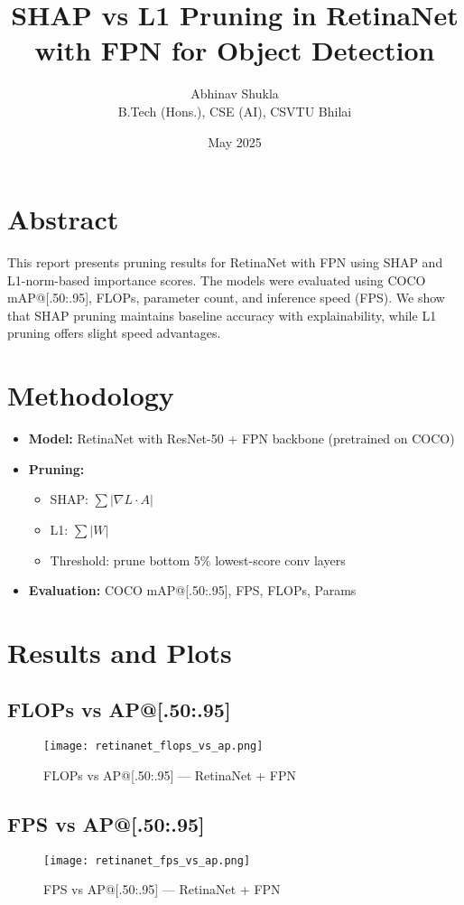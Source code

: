 \documentclass[11pt]{article}
\title{\textbf{SHAP vs L1 Pruning in RetinaNet with FPN for Object Detection}}
\author{Abhinav Shukla \\ B.Tech (Hons.), CSE (AI), CSVTU Bhilai}
\date{May 2025}
\begin{document}
\maketitle

\section*{Abstract}
This report presents pruning results for RetinaNet with FPN using SHAP and L1-norm-based importance scores. The models were evaluated using COCO mAP@[.50:.95], FLOPs, parameter count, and inference speed (FPS). We show that SHAP pruning maintains baseline accuracy with explainability, while L1 pruning offers slight speed advantages.

\section{Methodology}
\begin{itemize}
  \item \textbf{Model:} RetinaNet with ResNet-50 + FPN backbone (pretrained on COCO)
  \item \textbf{Pruning:}
    \begin{itemize}
      \item SHAP: \( \sum |\nabla L \cdot A| \)
      \item L1: \( \sum |W| \)
      \item Threshold: prune bottom 5\% lowest-score conv layers
    \end{itemize}
  \item \textbf{Evaluation:} COCO mAP@[.50:.95], FPS, FLOPs, Params
\end{itemize}

\section{Results and Plots}

\subsection*{FLOPs vs AP@[.50:.95]}
\begin{figure}[H]
  \centering
  \texttt{[image: retinanet\_flops\_vs\_ap.png]}
  \caption{FLOPs vs AP@[.50:.95] — RetinaNet + FPN}
\end{figure}

\subsection*{FPS vs AP@[.50:.95]}
\begin{figure}[H]
  \centering
  \texttt{[image: retinanet\_fps\_vs\_ap.png]}
  \caption{FPS vs AP@[.50:.95] — RetinaNet + FPN}
\end{figure}
\end{document}
